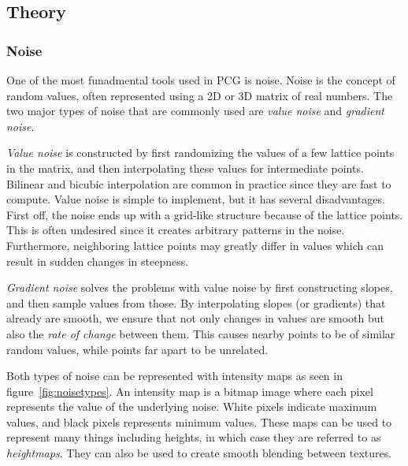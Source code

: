 \subsection{Theory}

\subsubsection{Noise}

One of the most funadmental tools used in PCG is noise.
Noise is the concept of random values, often represented using a 2D or 3D matrix of real numbers.
The two major types of noise that are commonly used are \textit{value noise} and \textit{gradient noise}.

\textit{Value noise} is constructed by first randomizing the values of a few lattice points in the matrix, and then interpolating these values for intermediate points.
Bilinear and bicubic interpolation are common in practice since they are fast to compute.
Value noise is simple to implement, but it has several disadvantages.
First off, the noise ends up with a grid-like structure because of the lattice points.
This is often undesired since it creates arbitrary patterns in the noise.
Furthermore, neighboring lattice points may greatly differ in values which can result in sudden changes in steepness.

\textit{Gradient noise} solves the problems with value noise by first constructing slopes, and then sample values from those.
By interpolating slopes (or gradients) that already are smooth, we ensure that not only changes in values are smooth but also the \textit{rate of change} between them.
This causes nearby points to be of similar random values, while points far apart to be unrelated.

Both types of noise can be represented with intensity maps as seen in figure~\ref{fig:noisetypes}.
An intensity map is a bitmap image where each pixel represents the value of the underlying noise.
White pixels indicate maximum values, and black pixels represents minimum values.
These maps can be used to represent many things including heights, in which case they are referred to as \textit{heightmaps}.
They can also be used to create smooth blending between textures.

